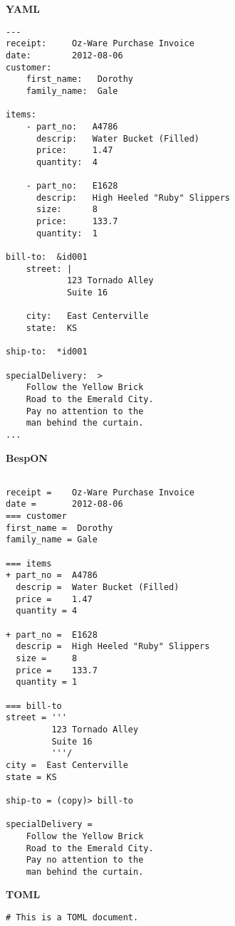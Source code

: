 \documentclass[11pt]{article}
\begin{document}
\begin{appendices}
\begin{tcolorbox}{}
\begin{multicols}{2}
\centering \textbf{YAML}
\begin{Verbatim}[formatcom=\color{DarkGreen}]
---
receipt:     Oz-Ware Purchase Invoice
date:        2012-08-06
customer:
    first_name:   Dorothy
    family_name:  Gale

items:
    - part_no:   A4786
      descrip:   Water Bucket (Filled)
      price:     1.47
      quantity:  4

    - part_no:   E1628
      descrip:   High Heeled "Ruby" Slippers
      size:      8
      price:     133.7
      quantity:  1

bill-to:  &id001
    street: |
            123 Tornado Alley
            Suite 16
    
    city:   East Centerville
    state:  KS

ship-to:  *id001

specialDelivery:  >
    Follow the Yellow Brick
    Road to the Emerald City.
    Pay no attention to the
    man behind the curtain.
...
\end{Verbatim}
\columnbreak
\centering \textbf{BespON}

\begin{Verbatim}

receipt =    Oz-Ware Purchase Invoice
date =       2012-08-06
=== customer
first_name =  Dorothy
family_name = Gale

=== items
+ part_no =  A4786
  descrip =  Water Bucket (Filled)
  price =    1.47
  quantity = 4

+ part_no =  E1628
  descrip =  High Heeled "Ruby" Slippers
  size =     8
  price =    133.7
  quantity = 1

=== bill-to
street = '''
         123 Tornado Alley
         Suite 16
         '''/
city =  East Centerville
state = KS

ship-to = (copy)> bill-to

specialDelivery =
    Follow the Yellow Brick
    Road to the Emerald City.
    Pay no attention to the
    man behind the curtain.

\end{Verbatim}
\end{multicols}
\end{tcolorbox}




\begin{tcolorbox}{}
\begin{multicols}{2}

\centering \textbf{TOML}
\begin{Verbatim}[formatcom=\color{DarkGreen}]
# This is a TOML document.


\end{Verbatim}
\end{multicols}
\end{tcolorbox}
\end{appendices}
\end{document}
